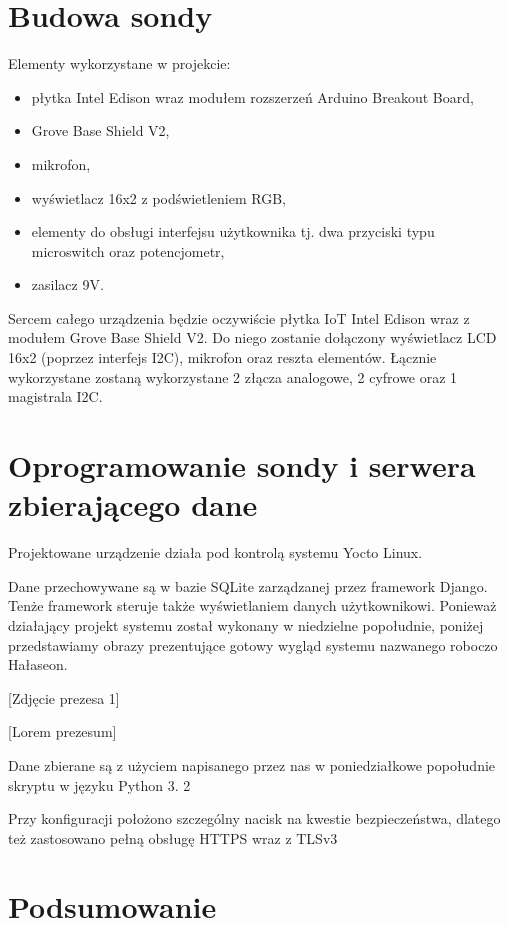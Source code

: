 \documentclass[12pt, a4paper]{article}
\begin{document}
\section{Budowa sondy}

Elementy wykorzystane w projekcie:
\begin{itemize}
\item płytka Intel Edison wraz modułem rozszerzeń Arduino Breakout Board,
\item Grove Base Shield V2,
\item mikrofon,
\item wyświetlacz 16x2 z podświetleniem RGB,
\item elementy do obsługi interfejsu użytkownika tj. dwa przyciski typu microswitch oraz potencjometr,
\item zasilacz 9V.
\end{itemize}

Sercem całego urządzenia będzie oczywiście płytka IoT Intel Edison wraz z modułem Grove Base Shield V2. Do niego zostanie dołączony wyświetlacz LCD 16x2 (poprzez interfejs I2C), mikrofon oraz reszta elementów. Łącznie wykorzystane zostaną wykorzystane 2 złącza analogowe, 2 cyfrowe oraz 1 magistrala I2C. 
\section{Oprogramowanie sondy i serwera zbierającego dane}

Projektowane urządzenie działa pod kontrolą systemu Yocto Linux.

Dane przechowywane są w bazie SQLite zarządzanej przez framework Django. Tenże framework steruje także wyświetlaniem danych użytkownikowi. Ponieważ działający projekt systemu został wykonany w niedzielne popołudnie, poniżej przedstawiamy obrazy prezentujące gotowy wygląd systemu nazwanego roboczo Hałaseon.

[Zdjęcie prezesa 1]
 
[Lorem prezesum]

Dane zbierane są z użyciem napisanego przez nas w poniedziałkowe popołudnie skryptu w języku Python 3. 2

Przy konfiguracji położono szczególny nacisk na kwestie bezpieczeństwa, dlatego też zastosowano pełną obsługę HTTPS wraz z TLSv3

\section{Podsumowanie}
\end{document}
